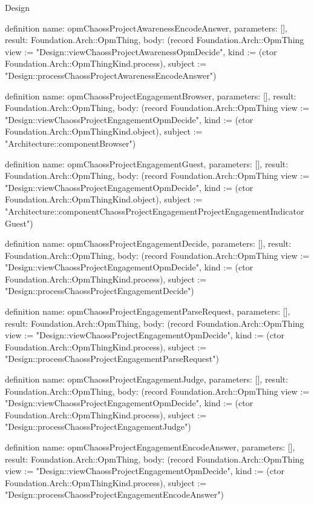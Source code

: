 \begin{lexlean}{Design}
\begin{semanticmodule}
definition{
  name: opmChaossProjectAwarenessEncodeAnswer,
  parameters: [],
  result: Foundation.Arch::OpmThing,
  body: (record Foundation.Arch::OpmThing {view := "Design::viewChaossProjectAwarenessOpmDecide", kind := (ctor Foundation.Arch::OpmThingKind.process), subject := "Design::processChaossProjectAwarenessEncodeAnswer"})
}

definition{
  name: opmChaossProjectEngagementBrowser,
  parameters: [],
  result: Foundation.Arch::OpmThing,
  body: (record Foundation.Arch::OpmThing {view := "Design::viewChaossProjectEngagementOpmDecide", kind := (ctor Foundation.Arch::OpmThingKind.object), subject := "Architecture::componentBrowser"})
}

definition{
  name: opmChaossProjectEngagementGuest,
  parameters: [],
  result: Foundation.Arch::OpmThing,
  body: (record Foundation.Arch::OpmThing {view := "Design::viewChaossProjectEngagementOpmDecide", kind := (ctor Foundation.Arch::OpmThingKind.object), subject := "Architecture::componentChaossProjectEngagementProjectEngagementIndicatorGuest"})
}

definition{
  name: opmChaossProjectEngagementDecide,
  parameters: [],
  result: Foundation.Arch::OpmThing,
  body: (record Foundation.Arch::OpmThing {view := "Design::viewChaossProjectEngagementOpmDecide", kind := (ctor Foundation.Arch::OpmThingKind.process), subject := "Design::processChaossProjectEngagementDecide"})
}

definition{
  name: opmChaossProjectEngagementParseRequest,
  parameters: [],
  result: Foundation.Arch::OpmThing,
  body: (record Foundation.Arch::OpmThing {view := "Design::viewChaossProjectEngagementOpmDecide", kind := (ctor Foundation.Arch::OpmThingKind.process), subject := "Design::processChaossProjectEngagementParseRequest"})
}

definition{
  name: opmChaossProjectEngagementJudge,
  parameters: [],
  result: Foundation.Arch::OpmThing,
  body: (record Foundation.Arch::OpmThing {view := "Design::viewChaossProjectEngagementOpmDecide", kind := (ctor Foundation.Arch::OpmThingKind.process), subject := "Design::processChaossProjectEngagementJudge"})
}

definition{
  name: opmChaossProjectEngagementEncodeAnswer,
  parameters: [],
  result: Foundation.Arch::OpmThing,
  body: (record Foundation.Arch::OpmThing {view := "Design::viewChaossProjectEngagementOpmDecide", kind := (ctor Foundation.Arch::OpmThingKind.process), subject := "Design::processChaossProjectEngagementEncodeAnswer"})
}


\end{semanticmodule}
\end{lexlean}
